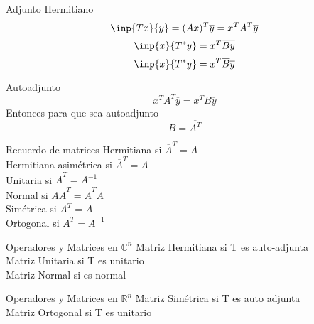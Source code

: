 \documentclass{beamer}
\newcommand{\C}{\mathbb{C}}
\begin{document}
\begin{frame}{Adjunto Hermitiano}
  $$\inp{Tx}{y} = (Ax)^T\overline y = x^TA^T\overline y$$
  $$\inp{x}{T^*y} = x^T\overline{By} $$
  $$\inp{x}{T^*y} = x^T\overline{B}\overline y$$
\end{frame}

\begin{frame}{Autoadjunto}
  $$x^TA^T\overline y= x^T\overline{B}\overline y$$
  Entonces para que sea autoadjunto
  $$B = \overline{A^{T}}$$
\end{frame}

\begin{frame}{Recuerdo de matrices}
  Hermitiana si $\overline A^T = A$\\
  Hermitiana asimétrica si $\overline A^T = A$\\
  Unitaria si $\overline A^T = A^{-1}$\\
  Normal si $A\overline A^T = \overline A^T A$\\
  \vspace{1cm}
  Simétrica si $ A^T = A$\\
  Ortogonal si $A^T = A^{-1}$

\end{frame}

\begin{frame}{Operadores y Matrices en $\C^n$}
  Matriz Hermitiana si T es auto-adjunta\\
  Matriz Unitaria si T es unitario\\
  Matriz Normal si es normal
\end{frame}

\begin{frame}{Operadores y Matrices en $\mathbb{R}^n$}
  Matriz Simétrica si T es auto adjunta\\
  Matriz Ortogonal si T es unitario\\
\end{frame}
\end{document}
